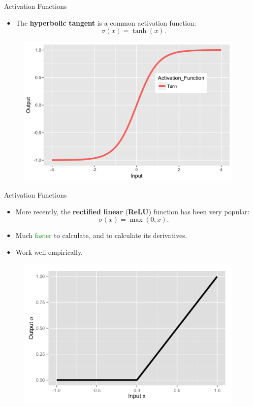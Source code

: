 \documentclass[usenames,dvipsnames,notes,11pt,aspectratio=169]{beamer}
\begin{document}
\begin{frame}{Activation Functions}

\begin{itemize}
\item The \textbf{hyperbolic tangent} is a common activation function:
\[
\sigma(x)=\tanh\left(x\right).
\]
\end{itemize}
\begin{figure}
\includegraphics[height=0.55\textheight]{figures/activationFn-Tanh}
\end{figure}
\end{frame}
%
\begin{frame}{Activation Functions}
\begin{itemize}
\item More recently, the \textbf{rectified linear} (\textbf{ReLU}) function has been very
popular:
\[
\sigma(x)=\max(0,x).
\]
\item Much \textcolor{Green}{faster} to calculate, and to calculate
its derivatives.
\item Work well empirically.
\end{itemize}
\begin{figure}
\includegraphics[height=0.55\textheight]{figures/activationFn-Rectified_Linear} 
\end{figure}
\end{frame}
\end{document}
